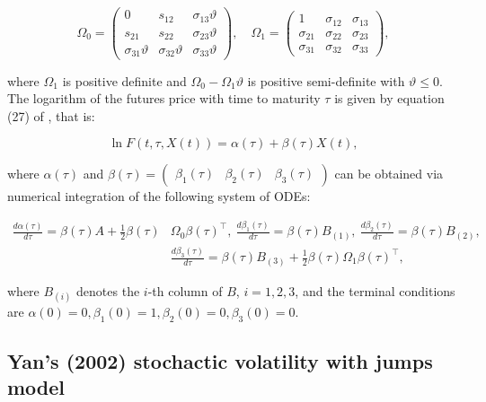 \documentclass{article}
\begin{document}
\begin{equation*}
    \Omega_0 = 
    \begin{pmatrix}
        0 & s_{12} & \sigma_{13} \vartheta \\
        s_{21} & s_{22} & \sigma_{23} \vartheta \\
        \sigma_{31} \vartheta & \sigma_{32} \vartheta & \sigma_{33} \vartheta 
    \end{pmatrix}, \quad \Omega_1 = \begin{pmatrix}
        1 & \sigma_{12} &  \sigma_{13} \\
        \sigma_{21} & \sigma_{22} & \sigma_{23} \\
        \sigma_{31} & \sigma_{32} & \sigma_{33}
    \end{pmatrix},
\end{equation*}

\noindent where $\Omega_1$ is positive definite and $\Omega_0 - \Omega_1 \vartheta$ is positive semi-definite with $\vartheta \leq 0$. The logarithm of the futures price with time to maturity $\tau$ is given by equation (27) of \cite{hughen10}, that is:

\begin{equation*}
    \ln{F(t,\tau, X(t))} = \alpha(\tau) + \beta(\tau) {X}(t),
\end{equation*}

\noindent where $\alpha(\tau)$ and $\beta(\tau) = \begin{pmatrix}
    \beta_1(\tau) & \beta_2(\tau) & \beta_3(\tau)
\end{pmatrix} $ can be obtained via numerical integration of the following system of ODEs:

\begin{align*}
    \frac{d\alpha(\tau)}{d\tau} = \beta(\tau) A + \frac{1}{2}  \beta(\tau) &\Omega_0 \beta(\tau)^\top, \
    \frac{d\beta_1(\tau)}{d\tau} = \beta(\tau) B_{(1)}, \ 
    \frac{d\beta_2(\tau)}{d\tau} = \beta(\tau) B_{(2)}, \\
    &\frac{d\beta_3(\tau)}{d\tau} = \beta(\tau) B_{(3)} + \frac{1}{2} \beta(\tau) \Omega_1 \beta(\tau)^\top,
\end{align*}

\noindent where $B_{(i)}$ denotes the $i$-th column of $B$, $i=1,2,3$, and the terminal conditions are $\alpha(0)=0,\beta_1(0)=1,\beta_2(0)=0,\beta_3(0)=0$.

\subsection{Yan's (2002) stochactic volatility with jumps model}
\end{document}
